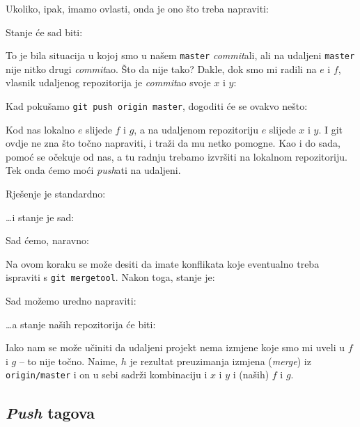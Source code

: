 Ukoliko, ipak, imamo ovlasti, onda je ono što treba napraviti:



Stanje će sad biti:



To je bila situacija u kojoj smo u našem \verb+master+ \emph{commit}ali, ali na udaljeni \verb+master+ nije nitko drugi \emph{commit}ao.
Što da nije tako?
Dakle, dok smo mi radili na $e$ i $f$, vlasnik udaljenog repozitorija je \emph{commit}ao svoje $x$ i $y$:



Kad pokušamo \verb+git push origin master+, dogoditi će se ovakvo nešto:



Kod nas lokalno $e$ slijede $f$ i $g$, a na udaljenom repozitoriju $e$ slijede $x$ i $y$. 
I git ovdje ne zna što točno napraviti, i traži da mu netko pomogne.
Kao i do sada, pomoć se očekuje od nas, a tu radnju trebamo izvršiti na lokalnom repozitoriju.
Tek onda ćemo moći \emph{push}ati na udaljeni.

Rješenje je standardno:


\dots{}i stanje je sad:



Sad ćemo, naravno:


Na ovom koraku se može desiti da imate konflikata koje eventualno treba ispraviti s \verb+git mergetool+.
Nakon toga, stanje je:



Sad možemo uredno napraviti:


\dots{}a stanje naših repozitorija će biti:



Iako nam se može učiniti da udaljeni projekt nema izmjene koje smo mi uveli u $f$ i $g$ -- to nije točno.
Naime, $h$ je rezultat preuzimanja izmjena (\emph{merge}) iz \verb+origin/master+ i on u sebi sadrži kombinaciju i $x$ i $y$ i (naših) $f$ i $g$.

\subsection*{\emph{Push} tagova}

